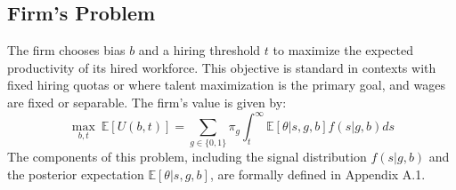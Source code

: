 \subsection{Firm's Problem}
The firm chooses bias $b$ and a hiring threshold $t$ to maximize the expected productivity of its hired workforce. This objective is standard in contexts with fixed hiring quotas or where talent maximization is the primary goal, and wages are fixed or separable. The firm's value is given by:
\begin{equation}
\max_{b, t} \ \mathbb{E}[U(b,t)] = \sum_{g \in \{0,1\}} \pi_g \int_t^\infty \mathbb{E}[\theta | s, g, b] f(s|g, b) ds
\end{equation}
The components of this problem, including the signal distribution $f(s|g,b)$ and the posterior expectation $\mathbb{E}[\theta|s,g,b]$, are formally defined in Appendix A.1.